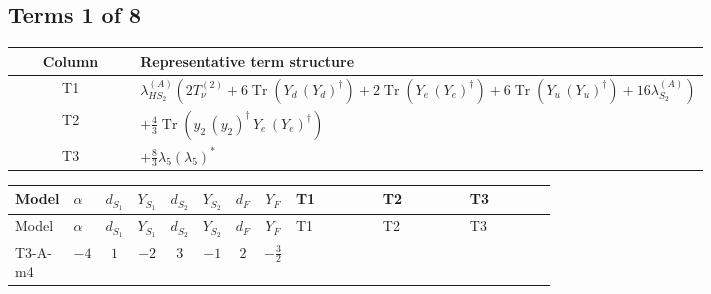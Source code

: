 \documentclass[8pt]{article}
\begin{document}
\begin{landscape}
\subsection*{Terms 1 of 8}
\begin{center}
\begin{tabular}{@{}c >{\raggedright\arraybackslash}p{0.82\linewidth}@{}}
\toprule
Column & Representative term structure \\
\midrule
T1 & \(\displaystyle {\lambda_{HS_2}^{(A)}} (2 T_{\nu}^{(2)}+6 \operatorname{Tr}\!\left({Y_d}\,\left({Y_d}\right)^{\dagger}\right)+2 \operatorname{Tr}\!\left({Y_e}\,\left({Y_e}\right)^{\dagger}\right)+6 \operatorname{Tr}\!\left({Y_u}\,\left({Y_u}\right)^{\dagger}\right)+16 {\lambda_{S_2}^{(A)}})\) \\
\midrule
T2 & \(\displaystyle +\frac{4}{3} \operatorname{Tr}\!\left({y_2}\,\left({y_2}\right)^{\dagger}\,{Y_e}\,\left({Y_e}\right)^{\dagger}\right)\) \\
\midrule
T3 & \(\displaystyle +\frac{8}{3} {\lambda_5} \left({\lambda_5}\right)^{*}\) \\
\midrule
\bottomrule
\end{tabular}
\end{center}
\smallskip
\tiny
\begin{longtable}{@{}llcccccc >{\raggedright\arraybackslash}p{0.21\linewidth} >{\raggedright\arraybackslash}p{0.21\linewidth} >{\raggedright\arraybackslash}p{0.21\linewidth}@{}}
\toprule
Model & $\alpha$ & $d_{S_1}$ & $Y_{S_1}$ & $d_{S_2}$ & $Y_{S_2}$ & $d_F$ & $Y_F$ & T1 & T2 & T3 \\
\midrule
\endfirsthead
\toprule
Model & $\alpha$ & $d_{S_1}$ & $Y_{S_1}$ & $d_{S_2}$ & $Y_{S_2}$ & $d_F$ & $Y_F$ & T1 & T2 & T3 \\
\midrule
\endhead
T3-A-m4 & $-4$ & $1$ & $-2$ & $3$ & $-1$ & $2$ & $-\frac{3}{2}$ & \scriptsize\adjustbox{max width=\linewidth}{$\begin{gathered} {\lambda_{HS_2}^{(A)}} (2 T_{\nu}^{(2)}+6 \operatorname{Tr}\!\left({Y_d}\,\left({Y_d}\right)^{\dagger}\right)+2 \operatorname{Tr}\!\left({Y_e}\,\left({Y_e}\right)^{\dagger}\right)+6 \operatorname{Tr}\!\left({Y_u}\,\left({Y_u}\right)^{\dagger}\right)+16 {\lambda_{S_2}^{(A)}})\end{gathered}$} & \scriptsize\adjustbox{max width=\linewidth}{$\begin{gathered} +\frac{4}{3} \operatorname{Tr}\!\left({y_2}\,\left({y_2}\right)^{\dagger}\,{Y_e}\,\left({Y_e}\right)^{\dagger}\right)\end{gathered}$} & \scriptsize\adjustbox{max width=\linewidth}{$\begin{gathered} +\frac{8}{3} {\lambda_5} \left({\lambda_5}\right)^{*}\end{gathered}$} \\

\end{longtable}
\end{landscape}
\end{document}
